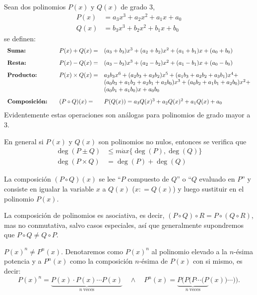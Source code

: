 Sean dos polinomios $P(x)$ y $Q(x)$ de grado 3,
\begin{align*}
    P(x) &= a_3 x^3 + a_2 x^2 + a_1 x + a_0\\
    Q(x) &= b_3 x^3 + b_2 x^2 + b_1 x + b_0
\end{align*}
se definen:
\[
    \begin{array}{lcll}
        \text{\textbf{Suma:}} && P(x) + Q(x) =& (a_3+b_3)x^3+(a_2+b_2)x^2+(a_1+b_1)x+(a_0+b_0)\\[3mm]
        \text{\textbf{Resta:}} && P(x) - Q(x) =& (a_3-b_3)x^3+(a_2-b_2)x^2+(a_1-b_1)x+(a_0-b_0)\\[3mm]
        \text{\textbf{Producto:}} && P(x)\times Q(x) =& a_3 b_3 x^6 + (a_2 b_3 + a_3 b_2)x^5 + (a_1 b_3 + a_2 b_2 + a_3 b_1)x^4 +\\
                                  &&&(a_0 b_3 + a_1 b_2 + a_2 b_1 + a_3 b_0)x^3 + (a_0 b_2 + a_1 b_1 + a_2 b_0)x^2 +\\
                                  &&&(a_0 b_1 + a_1 b_0)x + a_0 b_0\\[3mm]
        \text{\textbf{Composición:}} && (P \circ Q)(x) =& P(Q(x)) = a_3 Q(x)^3 + a_2 Q(x)^2 + a_1 Q(x) + a_0
    \end{array}
\]
Evidentemente estas operaciones son análogas para polinomios de grado mayor a 3.

\begin{remark.tcb}
    En general si $P(x)$ y $Q(x)$ son polinomios no nulos, entonces se verifica que
    \begin{align*}
        \deg{(P\pm Q)} &\leq m\acute ax\{\deg{(P)}, \deg{(Q)}\}\\
        \deg{(P\times Q)} &= \deg{(P)} + \deg{(Q)}
    \end{align*}
\end{remark.tcb}

\begin{remark.tcb}
    La composición $(P \circ Q)(x)$ se lee ``$P$ compuesto de $Q$'' o ``$Q$ evaluado en $P$'' y consiste en igualar la variable $x$ a $Q(x)$ ($x : = Q(x)$) y luego sustituir en el polinomio $P(x)$.
\end{remark.tcb}

La composición de polinomios es asociativa, es decir, $(P \circ Q) \circ R = P \circ (Q \circ R)$, mas no conmutativa, salvo casos especiales, así que generalmente supondremos que $P \circ Q \neq  Q \circ P$.

\begin{remark.tcb}
    $P(x)^n \neq P^n(x)$.
    Denotaremos como $P(x)^n$ al polinomio elevado a la $n$-ésima potencia y a $P^n(x)$ como la composición $n$-ésima de $P(x)$ con si mismo, es decir:
    \[
        P(x)^n = \underbrace{P(x) \cdot P(x) \cdots P(x)}_{n\ \text{veces}} \quad \land \quad
        P^n (x) = \underbrace{P(P(P\cdots(P}_{n\ \text{veces}}(x))\cdots)).
    \]
\end{remark.tcb}



